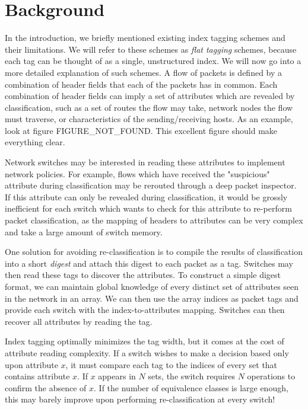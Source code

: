 \section{Background}

In the introduction, we briefly mentioned existing index tagging schemes and their limitations. We will refer to these schemes as \textit{flat tagging} schemes, because each tag can be thought of as a single, unstructured index.  We will now go into a more detailed explanation of such schemes. A flow of packets is defined by a combination of header fields that each of the packets has in common. Each combination of header fields can imply a set of attributes which are revealed by classification, such as a set of routes the flow may take, network nodes the flow must traverse, or characteristics of the sending/receiving hosts. As an example, look at figure FIGURE\_NOT\_FOUND. This excellent figure should make everything clear.

Network switches may be interested in reading these attributes to implement network policies.
For example, flows which have received the "suspicious" attribute during classification may be rerouted through a deep packet inspector. If this attribute can only be revealed during classification, it would be grossly inefficient for each switch which wants to check for this attribute to re-perform packet classification, as the mapping of headers to attributes can be very complex and take a large amount of switch memory. 

One solution for avoiding re-classification is to compile the results of classification into a short \textit{digest} and attach this digest to each packet as a tag. Switches may then read these tags to discover the attributes. To construct a simple digest format, we can maintain global knowledge of every distinct set of attributes seen in the network in an array. We can then use the array indices as packet tags and provide each switch with the index-to-attributes mapping. Switches can then recover all attributes by reading the tag. 


Index tagging optimally minimizes the tag width, but it comes at the cost of attribute reading complexity. If a switch wishes to make a decision based only upon attribute $x$, it must compare each tag to the indices of every set that contains attribute $x$. If $x$ appears in $N$ sets, the switch requires $N$ operations to confirm the absence of $x$. If the number of equivalence classes is large enough, this may barely improve upon performing re-classification at every switch!

